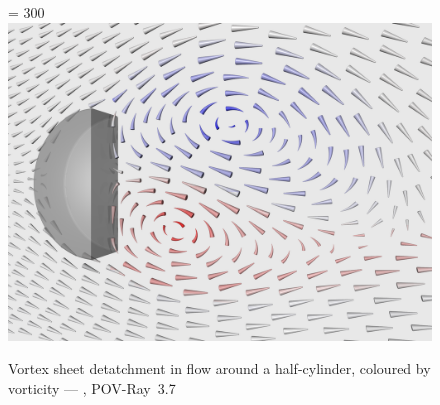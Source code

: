 \documentclass[12pt]{article}
\begin{document}
  \thispagestyle{empty}
  \begin{figure}
    \begin{center}
      \pdfimageresolution = 300
      \includegraphics{vfplot.png}
    \end{center}
    \caption*{Vortex sheet detatchment in flow around a half-cylinder,
      coloured by vorticity --- \vfplotversion, POV-Ray~3.7}
  \end{figure}
\end{document}
